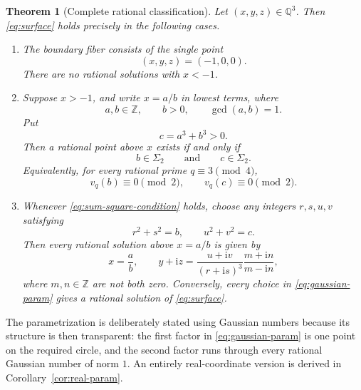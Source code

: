 \documentclass[11pt,a4paper]{article}
\numberwithin{equation}{section}
\newtheorem{theorem}{Theorem}[section]
\theoremstyle{definition}
\newcommand{\Q}{\mathbb{Q}}
\newcommand{\Z}{\mathbb{Z}}
\newcommand{\ii}{\mathrm{i}}
\newcommand{\sumsq}{\Sigma_2}
\begin{document}
\begin{theorem}[Complete rational classification]
\label{thm:main}
Let $(x,y,z)\in\Q^3$. Then \eqref{eq:surface} holds precisely in the following cases.

\begin{enumerate}
\item The boundary fiber consists of the single point
\begin{equation}
 (x,y,z)=(-1,0,0).
 \label{eq:boundary-point}
\end{equation}
There are no rational solutions with $x<-1$.

\item Suppose $x>-1$, and write $x=a/b$ in lowest terms, where
\begin{equation}
 a,b\in\Z,
 \qquad
 b>0,
 \qquad
 \gcd(a,b)=1.
 \label{eq:reduced-ab}
\end{equation}
Put
\begin{equation}
 c=a^3+b^3>0.
 \label{eq:def-c}
\end{equation}
Then a rational point above $x$ exists if and only if
\begin{equation}
 b\in\sumsq
 \qquad\text{and}\qquad
 c\in\sumsq.
 \label{eq:sum-square-condition}
\end{equation}
Equivalently, for every rational prime $q\equiv3\pmod4$,
\begin{equation}
 v_q(b)\equiv0\pmod2,
 \qquad
 v_q(c)\equiv0\pmod2.
 \label{eq:valuation-condition}
\end{equation}

\item Whenever \eqref{eq:sum-square-condition} holds, choose any integers $r,s,u,v$ satisfying
\begin{equation}
 r^2+s^2=b,
 \qquad
 u^2+v^2=c.
 \label{eq:base-representations}
\end{equation}
Then every rational solution above $x=a/b$ is given by
\begin{equation}
 \boxed{
 x=\frac ab,
 \qquad
 y+\ii z=
 \frac{u+\ii v}{(r+\ii s)^3}
 \frac{m+\ii n}{m-\ii n},
 }
 \label{eq:gaussian-param}
\end{equation}
where $m,n\in\Z$ are not both zero. Conversely, every choice in \eqref{eq:gaussian-param} gives a rational solution of \eqref{eq:surface}.
\end{enumerate}
\end{theorem}

The parametrization is deliberately stated using Gaussian numbers because its structure is then transparent: the first factor in \eqref{eq:gaussian-param} is one point on the required circle, and the second factor runs through every rational Gaussian number of norm $1$. An entirely real-coordinate version is derived in Corollary~\ref{cor:real-param}.
\end{document}
